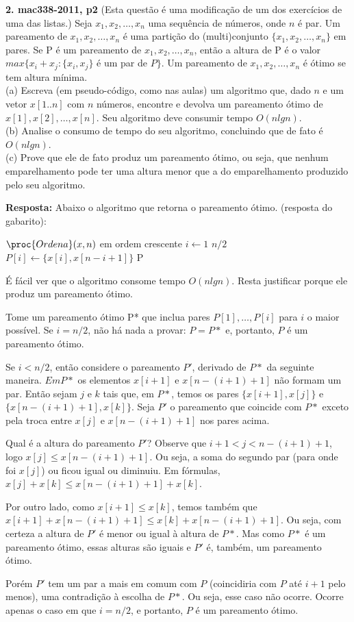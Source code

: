 
\noindent \textbf{2. mac338-2011, p2} (Esta questão é uma modificação de um dos exercícios de uma das listas.) Seja $x_1, x_2, \ldots , x_n$ uma sequência de números, onde $n$ é par. Um pareamento de $x_1, x_2, \ldots , x_n$ é uma partição do (multi)conjunto $\{x_1, x_2, \ldots , x_n\}$ em pares. Se P é um pareamento de $x_1, x_2, \ldots , x_n$, então a altura de P é o valor $max\{x_i+x_j : \{x_i, x_j\}$ é um par de $P\}$. Um pareamento de $x_1, x_2, \ldots , x_n$ é ótimo se tem altura mínima.\\[6pt]

\noindent (a) Escreva (em pseudo-código, como nas aulas) um algoritmo que, dado $n$ e um vetor $x[1..n]$ com $n$ números, encontre e devolva um pareamento ótimo de $x[1], x[2], \dots , x[n]$. Seu algoritmo deve
consumir tempo $O(n lg n)$.\\[2pt]
(b) Analise o consumo de tempo do seu algoritmo, concluindo que de fato é $O(n lg n)$.\\[2pt]
(c) Prove que ele de fato produz um pareamento ótimo, ou seja, que nenhum emparelhamento pode ter uma altura menor que a do emparelhamento produzido pelo seu algoritmo.

\textbf{Resposta:} Abaixo o algoritmo que retorna o pareamento ótimo. (resposta do gabarito):
\begin{codebox}
\li $\proc{Ordena}(x, n)$ \Comment em ordem crescente
\li \For $i \gets 1$ \To $n/2$
\li \Do
        $P[i] \gets \{x[i], x[n- i + 1]\}$
    \End
\li \Return P
\end{codebox}

É fácil ver que o algoritmo consome tempo $O(n lg n)$. Resta justificar porque ele produz um pareamento ótimo.

Tome um pareamento ótimo P* que inclua pares $P[1], \ldots ,P[i]$ para $i$ o maior possível. Se $i = n/2$, não há nada a provar: $P = P*$ e, portanto, $P$ é um pareamento ótimo.

Se $i < n/2$, então considere o pareamento $P'$, derivado de $P*$ da seguinte maneira. $Em P*$ os elementos $x[i + 1]$ e $x[n - (i + 1) + 1]$ não formam um par. Então sejam $j$ e $k$ tais que, em $P*$, temos os pares $\{x[i+1], x[j]\}$ e $\{x[n-(i+1)+1], x[k]\}$. Seja $P'$ o pareamento que coincide com $P*$ exceto pela troca entre $x[j]$ e $x[n - (i + 1) + 1]$ nos pares acima.

Qual é a altura do pareamento $P'$?
Observe que $i+1 < j < n-(i+1)+1$, logo $x[j] \leq x[n-(i+1)+1]$. Ou seja, a soma do segundo par (para onde foi $x[j]$) ou ficou igual ou diminuiu. Em fórmulas, $x[j]+x[k] \leq x[n-(i+1)+1]+x[k]$.

Por outro lado, como $x[i+1] \leq x[k]$, temos também que $x[i+1]+x[n-(i+1)+1] \leq x[k]+x[n-(i+1)+1]$. Ou seja, com certeza a altura de $P'$ é menor ou igual à altura de $P*$. Mas como $P*$ é um pareamento ótimo, essas alturas são iguais e $P'$ é, também, um pareamento ótimo.

Porém $P'$ tem um par a mais em comum com $P$ (coincidiria com $P$ até $i+1$ pelo menos), uma contradição à escolha de $P*$. Ou seja, esse caso não ocorre. Ocorre apenas o caso em que $i = n/2$, e portanto, $P$ é um pareamento ótimo.\\[12pt]